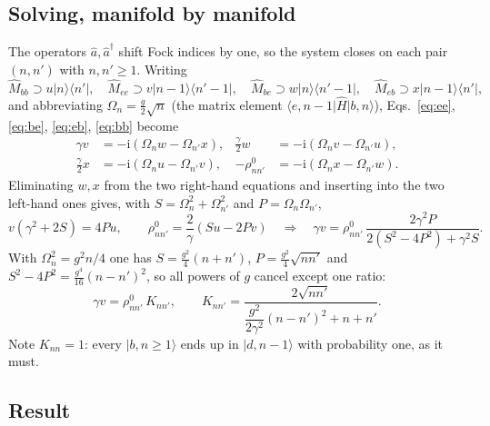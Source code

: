 \documentclass[11pt,a4paper]{article}
\newcommand{\ket}[1]{\lvert #1\rangle}
\newcommand{\bra}[1]{\langle #1\rvert}
\newcommand{\ketbra}[2]{\lvert #1\rangle\langle #2\rvert}
\newcommand{\ii}{\mathrm{i}}
\begin{document}
\subsection{Solving, manifold by manifold}

The operators $\hat a,\hat a^{\dagger}$ shift Fock indices by one, so the system
closes on each pair $(n,n')$ with $n,n'\ge1$.  Writing
\begin{equation}
  \hat M_{bb}\!\supset\!u\ketbra{n}{n'},\quad
  \hat M_{ee}\!\supset\!v\ketbra{n-1}{n'-1},\quad
  \hat M_{be}\!\supset\!w\ketbra{n}{n'-1},\quad
  \hat M_{eb}\!\supset\!x\ketbra{n-1}{n'},
\end{equation}
and abbreviating $\Omega_n=\tfrac{g}{2}\sqrt n$ (the matrix element
$\bra{e,n-1}\hat H\ket{b,n}$), Eqs.~\eqref{eq:ee}, \eqref{eq:be},
\eqref{eq:eb}, \eqref{eq:bb} become
\begin{align}
  \gamma v&=-\ii\left(\Omega_n w-\Omega_{n'}x\right), &
  \tfrac{\gamma}{2}w&=-\ii\left(\Omega_n v-\Omega_{n'}u\right),
  \label{eq:sys1}\\
  \tfrac{\gamma}{2}x&=-\ii\left(\Omega_n u-\Omega_{n'}v\right), &
  -\rho^{0}_{nn'}&=-\ii\left(\Omega_n x-\Omega_{n'}w\right).
  \label{eq:sys2}
\end{align}
Eliminating $w,x$ from the two right-hand equations and inserting into the two
left-hand ones gives, with $S=\Omega_n^{2}+\Omega_{n'}^{2}$ and
$P=\Omega_n\Omega_{n'}$,
\begin{equation}
  v\left(\gamma^{2}+2S\right)=4Pu,
  \qquad
  \rho^{0}_{nn'}=\frac{2}{\gamma}\left(Su-2Pv\right)
  \quad\Longrightarrow\quad
  \gamma v=\rho^{0}_{nn'}\,\frac{2\gamma^{2}P}
  {2\left(S^{2}-4P^{2}\right)+\gamma^{2}S}.
  \label{eq:solve}
\end{equation}
With $\Omega_n^{2}=g^{2}n/4$ one has $S=\tfrac{g^{2}}{4}(n+n')$,
$P=\tfrac{g^{2}}{4}\sqrt{nn'}$ and $S^{2}-4P^{2}=\tfrac{g^{4}}{16}(n-n')^{2}$,
so all powers of $g$ cancel except one ratio:
\begin{equation}
  \gamma v=\rho^{0}_{nn'}\,K_{nn'},
  \qquad
  K_{nn'}=\frac{2\sqrt{nn'}}
  {\dfrac{g^{2}}{2\gamma^{2}}\left(n-n'\right)^{2}+n+n'} .
  \label{eq:K}
\end{equation}
Note $K_{nn}=1$: every $\ket{b,n\ge1}$ ends up in $\ket{d,n-1}$ with
probability one, as it must.

\subsection{Result}
\end{document}
